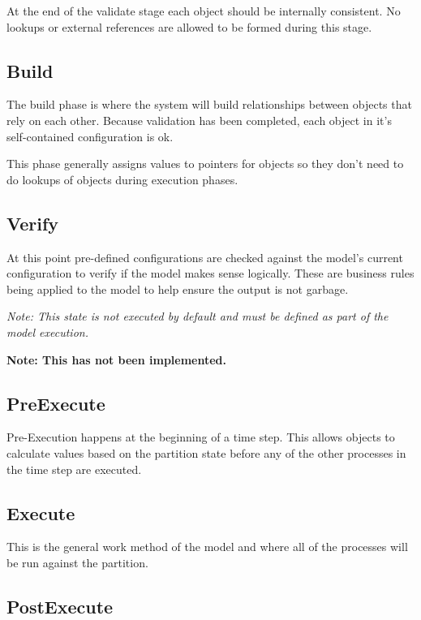 \documentclass[a4paper,11pt,twoside,pdftex,draft]{article}
\begin{document}
At the end of the validate stage each object should be internally
consistent. No lookups or external references are allowed to be formed
during this stage.

\hypertarget{build}{%
\subsection{Build}\label{build}}

The build phase is where the system will build relationships between
objects that rely on each other. Because validation has been completed,
each object in it's self-contained configuration is ok.

This phase generally assigns values to pointers for objects so they
don't need to do lookups of objects during execution phases.

\hypertarget{verify}{%
\subsection{Verify}\label{verify}}

At this point pre-defined configurations are checked against the model's
current configuration to verify if the model makes sense logically.
These are business rules being applied to the model to help ensure the
output is not garbage.

\emph{Note: This state is not executed by default and must be defined as
part of the model execution.}

\textbf{Note: This has not been implemented.}

\hypertarget{preexecute}{%
\subsection{PreExecute}\label{preexecute}}

Pre-Execution happens at the beginning of a time step. This allows
objects to calculate values based on the partition state before any of
the other processes in the time step are executed.

\hypertarget{execute}{%
\subsection{Execute}\label{execute}}

This is the general work method of the model and where all of the
processes will be run against the partition.

\hypertarget{postexecute}{%
\subsection{PostExecute}\label{postexecute}}
\end{document}
